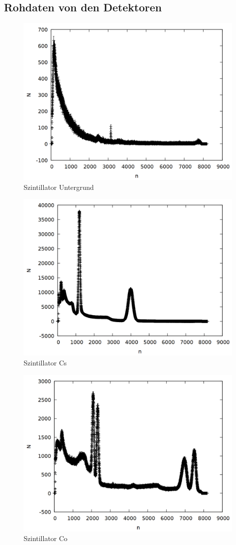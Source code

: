 \subsection{Rohdaten von den Detektoren}
\begin{figure}
\centering
\includegraphics[width=0.7\linewidth]{data/si_unter.png}
\caption{Szintillator Untergrund}
\end{figure}

\begin{figure}
\centering
\includegraphics[width=0.7\linewidth]{data/si_cs_raw.png}
\caption{Szintillator Cs}
\end{figure}

\begin{figure}
\centering
\includegraphics[width=0.7\linewidth]{data/si_co_raw.png}
\caption{Szintillator Co}
\end{figure}

